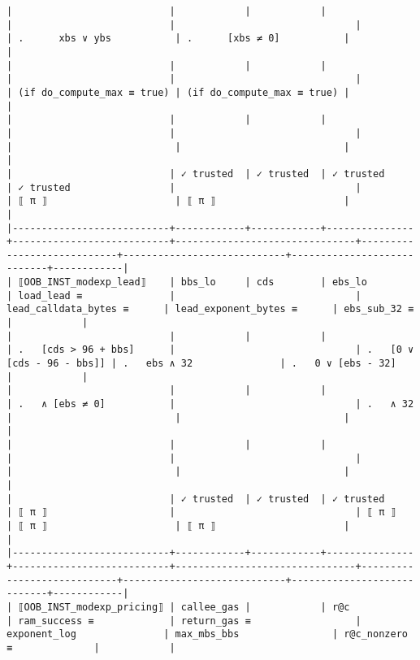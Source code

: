 \documentclass[varwidth=\maxdimen,margin=0.5cm,multi={verbatim}]{standalone}
\begin{document}
\begin{verbatim}
|                           |            |            |               |                           |                               |                            | .      xbs ∨ ybs           | .      [xbs ≠ 0]           |            |
|                           |            |            |               |                           |                               |                            | (if do_compute_max ≡ true) | (if do_compute_max ≡ true) |            |
|                           |            |            |               |                           |                               |                            |                            |                            |            |
|                           | ✓ trusted  | ✓ trusted  | ✓ trusted     | ✓ trusted                 |                               |                            | ⟦ π ⟧                      | ⟦ π ⟧                      |            |
|---------------------------+------------+------------+---------------+---------------------------+-------------------------------+----------------------------+----------------------------+----------------------------+------------|
| ⟦OOB_INST_modexp_lead⟧    | bbs_lo     | cds        | ebs_lo        | load_lead ≡               |                               | lead_calldata_bytes ≡      | lead_exponent_bytes ≡      | ebs_sub_32 ≡               |            |
|                           |            |            |               | .   [cds > 96 + bbs]      |                               | .   [0 ∨ [cds - 96 - bbs]] | .   ebs ∧ 32               | .   0 ∨ [ebs - 32]         |            |
|                           |            |            |               | .   ∧ [ebs ≠ 0]           |                               | .   ∧ 32                   |                            |                            |            |
|                           |            |            |               |                           |                               |                            |                            |                            |            |
|                           | ✓ trusted  | ✓ trusted  | ✓ trusted     | ⟦ π ⟧                     |                               | ⟦ π ⟧                      | ⟦ π ⟧                      | ⟦ π ⟧                      |            |
|---------------------------+------------+------------+---------------+---------------------------+-------------------------------+----------------------------+----------------------------+----------------------------+------------|
| ⟦OOB_INST_modexp_pricing⟧ | callee_gas |            | r@c           | ram_success ≡             | return_gas ≡                  | exponent_log               | max_mbs_bbs                | r@c_nonzero ≡              |            |

\end{verbatim}
\end{document}
